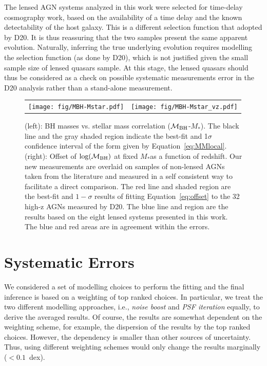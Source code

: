\documentclass[fleqn,usenatbib]{mnras}
\newcommand{\mbh}{$\mathcal M_{\rm BH}$}
\newcommand{\mstar}{{$M_*$}}
\begin{document}
The lensed AGN systems analyzed in this work were selected for time-delay cosmography work, based on the availability of a time delay and the known detectability of the host galaxy. This is a different selection function that adopted by D20. It is thus reassuring that the two samples present the same apparent evolution. Naturally, inferring the true underlying evolution requires modelling the selection function (as done by D20), which is not justified given the small sample size of lensed quasars sample. At this stage, the lensed quasars should thus be considered as a check on possible systematic measurements error in the D20 analysis rather than a stand-alone measurement.


\begin{figure}
\centering
\begin{tabular}{c c}
{\texttt{[image: fig/MBH-Mstar.pdf]}}&
{\texttt{[image: fig/MBH-Mstar\_vz.pdf]}}\\
\end{tabular}
\caption{\label{fig:scaling_relation} 
(left): BH masses vs. stellar mass correlation (\mbh-\mstar). The black line and the gray shaded region indicate the best-fit and 1$\sigma$ confidence interval of the form given by Equation~\ref{eq:MMlocal}.
(right): Offset of $\log(\mathcal M_{\rm BH})$ at fixed \mstar as a function of redshift. Our new measurements are overlaid on samples of non-lensed AGNs taken from the literature and measured in a self consistent way to facilitate a direct comparison. The red line and shaded region are the best-fit and $1-\sigma$ results of fitting  Equation~\eqref{eq:offset} to the 32 high-z AGNs measured by D20. The blue line and region are the results based on the eight lensed systems presented in this work. The blue and red areas are in agreement within the errors.}
\end{figure} 

\section{Systematic Errors}\label{sec:diss}

We considered a set of modelling choices to perform the fitting and the final inference is based on a weighting of top ranked choices. In particular, we treat the two different modelling approaches, i.e., {\it noise boost} and {\it PSF iteration} equally, to derive the averaged results. Of course, the results are somewhat dependent on the weighting scheme, for example, the dispersion of the results by the top ranked choices. However, the dependency is smaller than other sources of uncertainty. Thus, using different weighting schemes would only change the results marginally ($<0.1$~dex).
\end{document}
